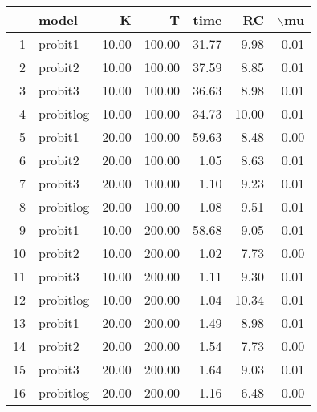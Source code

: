 \begin{tabular}{rlrrrrr}
  \hline
 & model & K & T & time & RC & $\backslash$mu \\ 
  \hline
1 & probit1 & 10.00 & 100.00 & 31.77 & 9.98 & 0.01 \\ 
  2 & probit2 & 10.00 & 100.00 & 37.59 & 8.85 & 0.01 \\ 
  3 & probit3 & 10.00 & 100.00 & 36.63 & 8.98 & 0.01 \\ 
  4 & probitlog & 10.00 & 100.00 & 34.73 & 10.00 & 0.01 \\ 
  5 & probit1 & 20.00 & 100.00 & 59.63 & 8.48 & 0.00 \\ 
  6 & probit2 & 20.00 & 100.00 & 1.05 & 8.63 & 0.01 \\ 
  7 & probit3 & 20.00 & 100.00 & 1.10 & 9.23 & 0.01 \\ 
  8 & probitlog & 20.00 & 100.00 & 1.08 & 9.51 & 0.01 \\ 
  9 & probit1 & 10.00 & 200.00 & 58.68 & 9.05 & 0.01 \\ 
  10 & probit2 & 10.00 & 200.00 & 1.02 & 7.73 & 0.00 \\ 
  11 & probit3 & 10.00 & 200.00 & 1.11 & 9.30 & 0.01 \\ 
  12 & probitlog & 10.00 & 200.00 & 1.04 & 10.34 & 0.01 \\ 
  13 & probit1 & 20.00 & 200.00 & 1.49 & 8.98 & 0.01 \\ 
  14 & probit2 & 20.00 & 200.00 & 1.54 & 7.73 & 0.00 \\ 
  15 & probit3 & 20.00 & 200.00 & 1.64 & 9.03 & 0.01 \\ 
  16 & probitlog & 20.00 & 200.00 & 1.16 & 6.48 & 0.00 \\ 
   \hline
\end{tabular}
